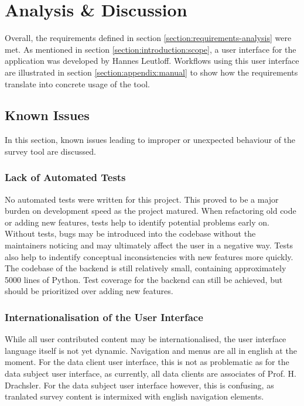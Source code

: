 \section{Analysis \& Discussion}
	Overall, the requirements defined in section \ref{section:requirements-analysis} were met.
	As mentioned in section \ref{section:introduction:scope}, a user interface for the
	application was developed by Hannes Leutloff. Workflows using this user interface are
	illustrated in section \ref{section:appendix:manual} to show how the requirements
	translate into concrete usage of the tool.

    \subsection{Known Issues}
    	In this section, known issues leading to improper or unexpected
    	behaviour of the survey tool are discussed.

    	\subsubsection{Lack of Automated Tests}
    		No automated tests were written for this project. This proved
    		to be a major burden on development speed as the project
    		matured. When refactoring old code or adding new features,
    		tests help to identify potential problems early on.
    		Without tests, bugs may be introduced into the codebase
    		without the maintainers noticing and may ultimately
    		affect the user in a negative way. Tests also
    		help to indentify conceptual inconsistencies
    		with new features more quickly. The codebase of the
    		backend is still relatively small, containing
    		approximately 5000 lines of Python. Test coverage for
    		the backend can still be achieved, but should be prioritized
    		over adding new features.

    	\subsubsection{Internationalisation of the User Interface}
    		While all user contributed content may be internationalised,
    		the user interface language itself is not yet dynamic.
    		Navigation and menus are all in english at the moment.
    		For the data client user interface, this is not as
    		problematic as for the data subject user interface, as 
    		currently, all data clients are associates of Prof. H. Drachsler.
    		For the data subject user interface however, this is confusing,
    		as tranlated survey content is intermixed with english
    		navigation elements.


